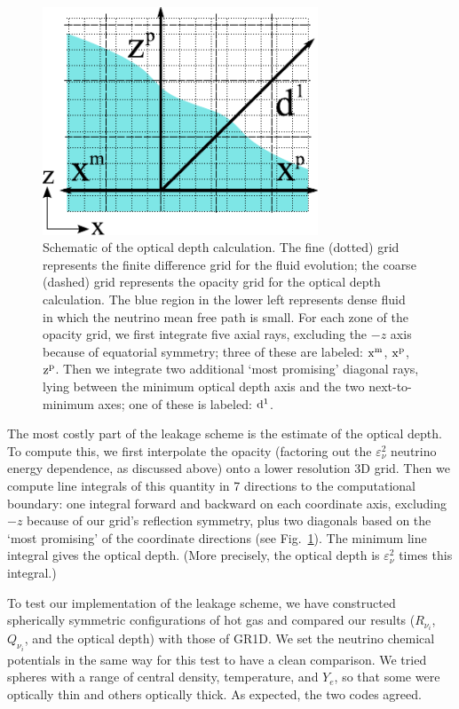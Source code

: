 \begin{figure}
\centering
\includegraphics[width=8.2cm]{Figures/chi_opacity_grid}
\caption[Schematic of optical depth calculation]{
Schematic of the optical depth calculation. The fine (dotted) grid
represents the finite difference grid for the fluid evolution; the coarse
(dashed) grid represents the opacity grid for the optical depth calculation.
The blue region in the lower left represents dense fluid in which the neutrino
mean free path is small. For each zone of the opacity grid, we first integrate
five axial rays, excluding the $-z$
axis because of equatorial symmetry; three of these are labeled:
$\rm x^m$, $\rm x^p$, $\rm z^p$.
Then we integrate two additional `most promising' diagonal rays,
lying between the minimum optical depth axis and the two next-to-minimum axes;
one of these is labeled: $\rm d^1$.
}
\label{fig:chi_opacity_grid}
\end{figure}

The most costly part of the leakage scheme is the estimate of the
optical depth.  To compute this, we first interpolate the opacity
(factoring out the $\varepsilon_{\nu}^2$ neutrino energy dependence, as discussed
above) onto a lower resolution 3D grid.  Then we compute
line integrals of this quantity in 7 directions to the computational boundary:
one integral forward and backward on each coordinate axis, excluding $-z$ because of our
grid's reflection symmetry, plus two diagonals based on the `most
promising' of the coordinate directions (see Fig.~\ref{fig:chi_opacity_grid}).
The minimum line integral gives the optical depth.
(More precisely, the optical depth is $\varepsilon_{\nu}^2$ times this integral.)

To test our implementation of the leakage scheme, we have constructed
spherically symmetric configurations of hot gas and compared our
results ($R_{\nu_i}$, $Q_{\nu_i}$, and the optical depth) with those
of GR1D.  We set the neutrino chemical potentials in the same way for
this test to have a clean comparison.  We tried spheres with a range of
central density, temperature,
and $Y_e$, so that some were optically thin and others optically thick. 
As expected, the two codes agreed.

